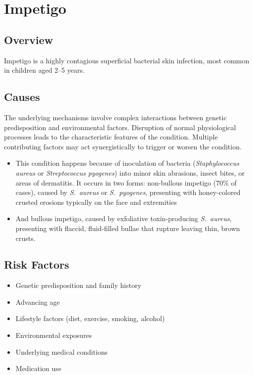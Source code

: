 \chapter{Impetigo}
\label{sec:Impetigo}

\section{Overview}
Impetigo is a highly contagious superficial bacterial skin infection, most common in children aged 2--5 years.
\section{Causes}
The underlying mechanisms involve complex interactions between genetic predisposition and environmental factors. Disruption of normal physiological processes leads to the characteristic features of the condition. Multiple contributing factors may act synergistically to trigger or worsen the condition.

\begin{itemize}[noitemsep]
  \item This condition happens because of inoculation of bacteria (\textit{Staphylococcus aureus} or \textit{Streptococcus pyogenes}) into minor skin abrasions, insect bites, or areas of dermatitis. It occurs in two forms: non-bullous impetigo (70\% of cases), caused by \textit{S.~aureus} or \textit{S.~pyogenes}, presenting with honey-colored crusted erosions typically on the face and extremities
  \item And bullous impetigo, caused by exfoliative toxin-producing \textit{S.~aureus}, presenting with flaccid, fluid-filled bullae that rupture leaving thin, brown crusts.
\end{itemize}
\section{Risk Factors}


\begin{itemize}[noitemsep]
  \item Genetic predisposition and family history
  \item Advancing age
  \item Lifestyle factors (diet, exercise, smoking, alcohol)
  \item Environmental exposures
  \item Underlying medical conditions
  \item Medication use
\end{itemize}
